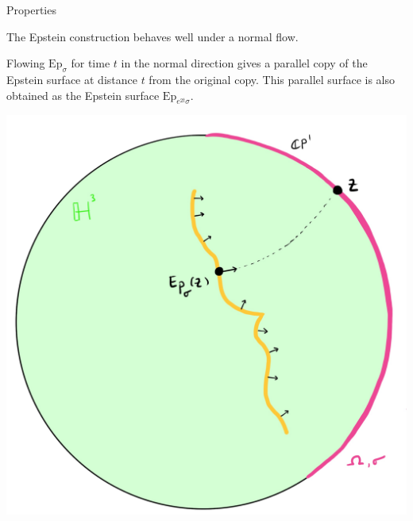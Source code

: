 \documentclass[professionalfont]{beamer}
\begin{document}
\begin{frame}{Properties}

The Epstein construction behaves well under a normal flow. 

Flowing $\mathrm{Ep}_\sigma$ for time $t$ in the normal direction gives a parallel copy of the Epstein surface at distance $t$ from the original copy. This parallel surface is also obtained as the Epstein surface $\mathrm{Ep}_{e^{2t}\sigma}$.

\centering\includegraphics[scale=0.09]{Parallel-6.jpg}

\end{frame}


\end{document}
